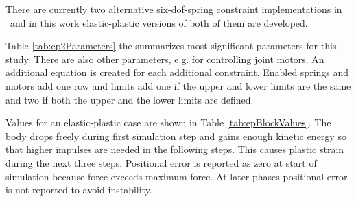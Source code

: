 There are currently two alternative six-dof-spring constraint implementations in \bullet\ and 
in this work elastic-plastic versions of both of them are developed. 

Table  \ref{tab:ep2Parameters} the summarizes most significant parameters for this study.
There are also other parameters, e.g. for controlling joint motors.
An additional equation is created for each additional constraint. 
Enabled springs and motors add one row and
limits add one if the upper and lower limits are the same and two if both the 
upper and the lower limits are defined.

\begin{table}
\label{tab:ep2Parameters} 
\end {table}


Values for an elastic-plastic case are shown in Table \ref{tab:epBlockValues}.
The body drops freely during first simulation step and 
gains enough kinetic energy so that higher impulses are needed in the following steps.
This causes plastic strain during the next three steps. 
Positional error is reported as zero at start of simulation because force exceeds
maximum force.  At later phases positional error is not reported to avoid instability.


